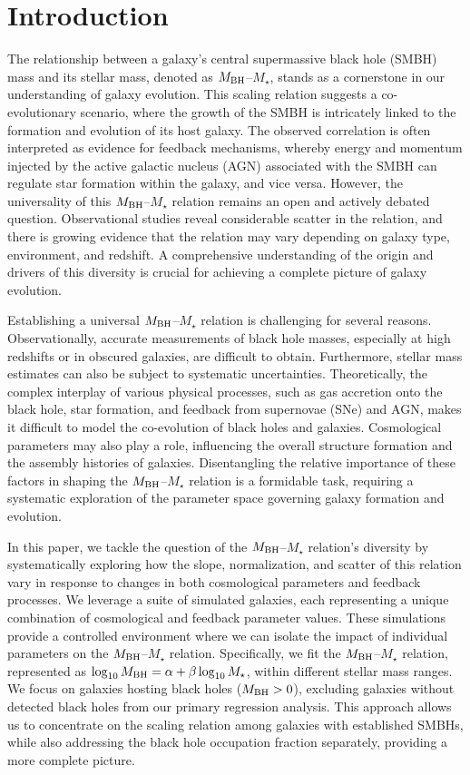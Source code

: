 \documentclass[twocolumn]{aastex631}
\begin{document}
\section{Introduction}
\label{sec:intro}
The relationship between a galaxy's central supermassive black hole (SMBH) mass and its stellar mass, denoted as $M_{\rm BH}$--$M_{\star}$, stands as a cornerstone in our understanding of galaxy evolution. This scaling relation suggests a co-evolutionary scenario, where the growth of the SMBH is intricately linked to the formation and evolution of its host galaxy. The observed correlation is often interpreted as evidence for feedback mechanisms, whereby energy and momentum injected by the active galactic nucleus (AGN) associated with the SMBH can regulate star formation within the galaxy, and vice versa. However, the universality of this $M_{\rm BH}$--$M_{\star}$ relation remains an open and actively debated question. Observational studies reveal considerable scatter in the relation, and there is growing evidence that the relation may vary depending on galaxy type, environment, and redshift. A comprehensive understanding of the origin and drivers of this diversity is crucial for achieving a complete picture of galaxy evolution.

Establishing a universal $M_{\rm BH}$--$M_{\star}$ relation is challenging for several reasons. Observationally, accurate measurements of black hole masses, especially at high redshifts or in obscured galaxies, are difficult to obtain. Furthermore, stellar mass estimates can also be subject to systematic uncertainties. Theoretically, the complex interplay of various physical processes, such as gas accretion onto the black hole, star formation, and feedback from supernovae (SNe) and AGN, makes it difficult to model the co-evolution of black holes and galaxies. Cosmological parameters may also play a role, influencing the overall structure formation and the assembly histories of galaxies. Disentangling the relative importance of these factors in shaping the $M_{\rm BH}$--$M_{\star}$ relation is a formidable task, requiring a systematic exploration of the parameter space governing galaxy formation and evolution.

In this paper, we tackle the question of the $M_{\rm BH}$--$M_{\star}$ relation's diversity by systematically exploring how the slope, normalization, and scatter of this relation vary in response to changes in both cosmological parameters and feedback processes. We leverage a suite of simulated galaxies, each representing a unique combination of cosmological and feedback parameter values. These simulations provide a controlled environment where we can isolate the impact of individual parameters on the $M_{\rm BH}$--$M_{\star}$ relation. Specifically, we fit the $M_{\rm BH}$--$M_{\star}$ relation, represented as $\log_{10} M_{\rm BH} = \alpha + \beta \log_{10} M_{\star}$, within different stellar mass ranges. We focus on galaxies hosting black holes ($M_{\rm BH} > 0$), excluding galaxies without detected black holes from our primary regression analysis. This approach allows us to concentrate on the scaling relation among galaxies with established SMBHs, while also addressing the black hole occupation fraction separately, providing a more complete picture.
\end{document}

